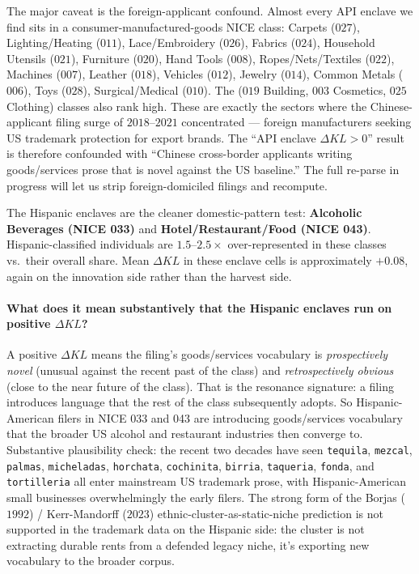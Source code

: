 \documentclass[11pt]{article}
\begin{document}
The major caveat is the foreign-applicant confound. Almost every API
enclave we find sits in a consumer-manufactured-goods NICE class:
Carpets ($027$), Lighting/Heating ($011$), Lace/Embroidery ($026$),
Fabrics ($024$), Household Utensils ($021$), Furniture ($020$),
Hand Tools ($008$), Ropes/Nets/Textiles ($022$), Machines ($007$),
Leather ($018$), Vehicles ($012$), Jewelry ($014$), Common Metals
($006$), Toys ($028$), Surgical/Medical ($010$). The
($019$ Building, $003$ Cosmetics, $025$ Clothing) classes also rank
high. These are exactly the sectors where the Chinese-applicant
filing surge of $2018$--$2021$ concentrated --- foreign manufacturers
seeking US trademark protection for export brands. The ``API
enclave $\Delta KL > 0$'' result is therefore confounded with
``Chinese cross-border applicants writing goods/services prose that
is novel against the US baseline.'' The full re-parse in progress
will let us strip foreign-domiciled filings and recompute.

The Hispanic enclaves are the cleaner domestic-pattern test:
\textbf{Alcoholic Beverages (NICE 033)} and \textbf{Hotel/Restaurant/Food
(NICE 043)}. Hispanic-classified individuals are $1.5$--$2.5\times$
over-represented in these classes vs.\ their overall share. Mean
$\Delta KL$ in these enclave cells is approximately $+0.08$, again
on the innovation side rather than the harvest side.

\paragraph{What does it mean substantively that the Hispanic
enclaves run on positive $\Delta KL$?} A positive $\Delta KL$ means
the filing's goods/services vocabulary is \emph{prospectively novel}
(unusual against the recent past of the class) and
\emph{retrospectively obvious} (close to the near future of the
class). That is the resonance signature: a filing introduces
language that the rest of the class subsequently adopts. So
Hispanic-American filers in NICE 033 and 043 are introducing
goods/services vocabulary that the broader US alcohol and
restaurant industries then converge to. Substantive plausibility
check: the recent two decades have seen \texttt{tequila},
\texttt{mezcal}, \texttt{palmas}, \texttt{micheladas},
\texttt{horchata}, \texttt{cochinita}, \texttt{birria},
\texttt{taqueria}, \texttt{fonda}, and \texttt{tortilleria} all
enter mainstream US trademark prose, with Hispanic-American small
businesses overwhelmingly the early filers. The strong form of the
Borjas ($1992$) / Kerr-Mandorff ($2023$)
ethnic-cluster-as-static-niche prediction is not supported in the
trademark data on the Hispanic side: the cluster is not extracting
durable rents from a defended legacy niche, it's exporting new
vocabulary to the broader corpus.
\end{document}
